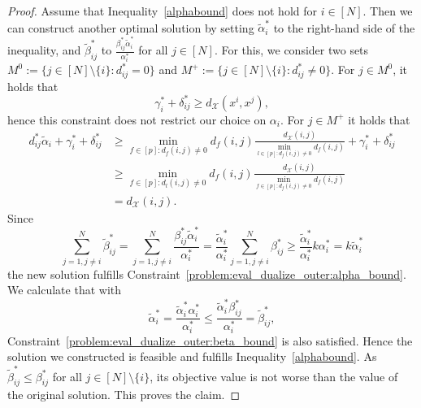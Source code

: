 \documentclass[10pt,a4paper]{amsart}
\newcommand{\X}{{\mathcal{X}}} %
\newcommand{\instanceindex}{i}
\newcommand{\instanceindextwo}{j}
\newcommand{\instfeatures}{[p]} %
\newcommand{\soldist}[1][(\instanceindex,\instanceindextwo)]{d_\X#1} %
\newcommand{\solution}{x}
\begin{document}
\begin{proof}
	Assume that Inequality~\eqref{alphabound} does not hold for  $i \in [N]$. Then we can construct another optimal solution by
        setting $\tilde{\alpha}_i^*$ to the right-hand side of the inequality, and $\tilde{\beta}^*_{ij}$ to $\frac{\beta^*_{ij}\tilde{\alpha}_i^*}{\alpha_i^*}$ for all $j\in [N]$. For this, we consider two sets $M^0 := \{j \in [N]\setminus \{i\} \colon d^*_{ij} = 0\}$ and $M^+:= \{j \in [N]\setminus \{i\} \colon d^*_{ij} \neq 0\}$. For $j \in M^0$, it holds that
	\begin{equation*}
		\gamma_i^* + \delta^*_{ij} \geq d_\X(\solution^i,\solution^j),
	\end{equation*}
	hence this constraint does not restrict our choice on $\alpha_i$. For $j \in M^+$ it holds that
	\begin{align*}
		d_{ij}^* \tilde{\alpha}_i + \gamma_i^* + \delta_{ij}^*& \geq \min_{f\in \instfeatures: d_f(i,j) \neq 0}d_f(i,j) \frac{\soldist}{\min_{l\in \instfeatures: d_f(i,j) \neq 0} d_f(i,j)} + \gamma_i^* + \delta_{ij}^*\\ 
		&\geq \min_{f\in \instfeatures: d_l(i,j) \neq 0}d_f(i,j) \frac{\soldist}{\min_{f\in \instfeatures: d_f(i,j) \neq 0} d_f(i,j)}\\ 
		&= \soldist. %
	\end{align*}
Since
	\begin{equation*}
		\sum_{j =1,j\neq i}^N \tilde{\beta}_{ij}^* = \sum_{j =1,j\neq i}^N \frac{\beta_{ij}^* \tilde{\alpha}^*_i}{\alpha_i^*} = \frac{\tilde{\alpha}^*_i}{\alpha_i^*} \sum_{j =1,j\neq i}^N \beta_{ij}^* \geq \frac{\tilde{\alpha}^*_i}{\alpha_i^*} k \alpha_i^* = k \tilde{\alpha}_i^*
	\end{equation*}
the new solution fulfills Constraint~\eqref{problem:eval_dualize_outer:alpha_bound}.
We calculate that with
	\begin{equation*}
		\tilde{\alpha}_i^* = \frac{\tilde{\alpha}_i^* \alpha_i^*}{\alpha_i^*} \leq \frac{\tilde{\alpha}_i^* \beta_{ij}^*}{\alpha_i^*} = \tilde{\beta}_{ij}^*,
	\end{equation*}
Constraint~\eqref{problem:eval_dualize_outer:beta_bound} is also satisfied. Hence the solution we constructed is feasible and fulfills Inequality~\eqref{alphabound}. As $\tilde{\beta}_{ij}^* \leq \beta_{ij}^*$ for all $j \in [N]\setminus \{i\}$, its objective value is not worse than the value of the original solution. This proves the claim. %
\end{proof}
\end{document}
